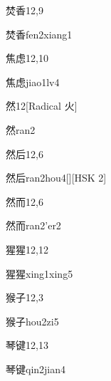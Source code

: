 \begin{entry}{焚香}{12,9}
  \begin{phonetics}{焚香}{fen2xiang1}
  \end{phonetics}
\end{entry}

\begin{entry}{焦虑}{12,10}
  \begin{phonetics}{焦虑}{jiao1lv4}
  \end{phonetics}
\end{entry}

\begin{entry}{然}{12}[Radical 火]
  \begin{phonetics}{然}{ran2}
  \end{phonetics}
\end{entry}

\begin{entry}{然后}{12,6}
  \begin{phonetics}{然后}{ran2hou4}[][HSK 2]
  \end{phonetics}
\end{entry}

\begin{entry}{然而}{12,6}
  \begin{phonetics}{然而}{ran2'er2}
  \end{phonetics}
\end{entry}

\begin{entry}{猩猩}{12,12}
  \begin{phonetics}{猩猩}{xing1xing5}
  \end{phonetics}
\end{entry}

\begin{entry}{猴子}{12,3}
  \begin{phonetics}{猴子}{hou2zi5}
  \end{phonetics}
\end{entry}

\begin{entry}{琴键}{12,13}
  \begin{phonetics}{琴键}{qin2jian4}
  \end{phonetics}
\end{entry}

